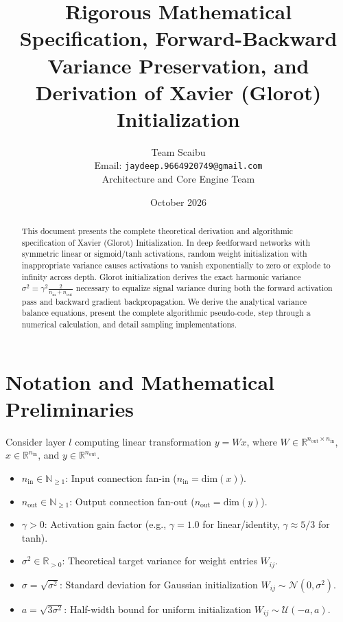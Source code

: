 \documentclass[11pt,a4paper]{article}
\title{\textbf{Rigorous Mathematical Specification, Forward-Backward Variance Preservation, and Derivation of Xavier (Glorot) Initialization}}
\author{Team Scaibu \\ \small Email: \texttt{jaydeep.9664920749@gmail.com} \\ \small Architecture and Core Engine Team}
\date{October 2026}
\theoremstyle{definition}
\begin{document}
\maketitle

\begin{abstract}
This document presents the complete theoretical derivation and algorithmic specification of Xavier (Glorot) Initialization. In deep feedforward networks with symmetric linear or sigmoid/tanh activations, random weight initialization with inappropriate variance causes activations to vanish exponentially to zero or explode to infinity across depth. Glorot initialization derives the exact harmonic variance $\sigma^2 = \gamma^2 \frac{2}{n_{\text{in}} + n_{\text{out}}}$ necessary to equalize signal variance during both the forward activation pass and backward gradient backpropagation. We derive the analytical variance balance equations, present the complete algorithmic pseudo-code, step through a numerical calculation, and detail sampling implementations.
\end{abstract}

\section{Notation and Mathematical Preliminaries}

Consider layer $l$ computing linear transformation $y = W x$, where $W \in \mathbb{R}^{n_{\text{out}} \times n_{\text{in}}}$, $x \in \mathbb{R}^{n_{\text{in}}}$, and $y \in \mathbb{R}^{n_{\text{out}}}$.

\begin{itemize}
    \item $n_{\text{in}} \in \mathbb{N}_{\ge 1}$: Input connection fan-in ($n_{\text{in}} = \text{dim}(x)$).
    \item $n_{\text{out}} \in \mathbb{N}_{\ge 1}$: Output connection fan-out ($n_{\text{out}} = \text{dim}(y)$).
    \item $\gamma > 0$: Activation gain factor (e.g., $\gamma = 1.0$ for linear/identity, $\gamma \approx 5/3$ for tanh).
    \item $\sigma^2 \in \mathbb{R}_{> 0}$: Theoretical target variance for weight entries $W_{ij}$.
    \item $\sigma = \sqrt{\sigma^2}$: Standard deviation for Gaussian initialization $W_{ij} \sim \mathcal{N}(0, \sigma^2)$.
    \item $a = \sqrt{3 \sigma^2}$: Half-width bound for uniform initialization $W_{ij} \sim \mathcal{U}(-a, a)$.
\end{itemize}
\end{document}
